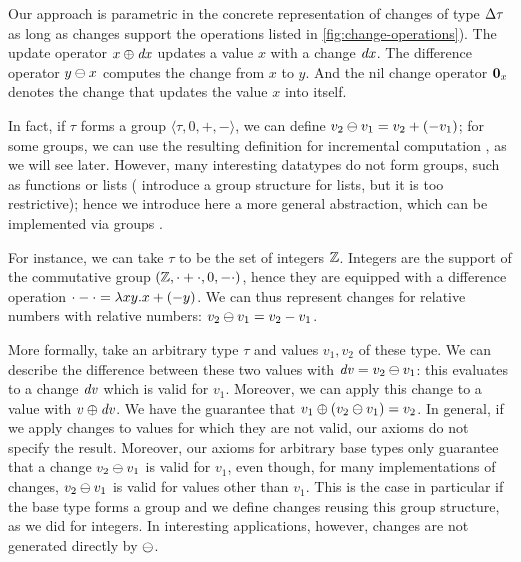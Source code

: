 \begin{oldSec}
Our approach is parametric in the concrete representation of
changes of type $\Change{\tau}$ as long as changes support the
operations listed in \cref{fig:change-operations}).
The update operator $\Apply{\D x}{x}$ updates a value $x$ with a
change $\mathit{dx}$. The difference operator $\Diff{y}{x}$ computes the
change from $x$ to $y$.
And the nil change operator $\NilC{x}$
denotes the change that updates the value $x$ into itself.

In fact, if $\tau$ forms a group $\langle \tau, 0, +, -\rangle$,
we can define $\Diff{v_2}{v_1} = v_2 + (- v_1)$; for some groups,
we can use the resulting definition for incremental computation
, as we will see later.
However, many interesting datatypes do not form groups, such as
functions or lists (\citet{GlucheGrust97Incr} introduce a group
structure for lists, but it is too restrictive);
hence we introduce here a more general abstraction, which can be
implemented via groups .

For instance, we can take $\tau$ to be the set of integers $\mathbb Z$. Integers are
the support of the commutative group $(\mathbb Z, \cdot + \cdot, 0, -\cdot)$, hence they are equipped
with a difference operation $\cdot-\cdot = \lambda x y. x + (-y)$. We can thus represent
changes for relative numbers with relative numbers: $\Diff{v_2}{v_1} = v_2 -
v_1$.

More formally, take an arbitrary type $\tau$ and values $v_1, v_2$ of
these type. We can describe the difference between these two values
with $\D v = \Diff{v_2}{v_1}$: this evaluates to a change $\mathit{dv}$ which is
valid for $v_1$. Moreover, we can apply  this change to a value
with $\Apply{\D v}v$. We have the guarantee that
$\Apply{\left(\Diff{v_2}{v_1}\right)}{v_1} = v_2$. In general, if we
apply changes to values for which they are not valid, our axioms do
not specify the result. Moreover, our axioms for arbitrary base types
only guarantee that a change $\Diff{v_2}{v_1}$ is valid for $v_1$,
even though, for many implementations of changes, $\Diff{v_2}{v_1}$ is
valid for values other than $v_1$. This is the case in particular if
the base type forms a group and we define changes reusing this group
structure, as we did for integers. In interesting applications, however, changes
are not generated directly by $\DIFF$.


\end{oldSec}

